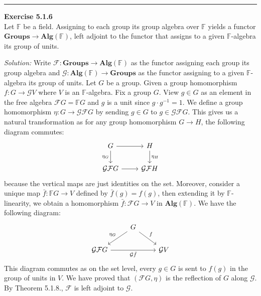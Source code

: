 \documentclass[a4paper, 12pt]{article}
\newenvironment{problem}[2][Exercise]
    { \begin{mdframed}[backgroundcolor=gray!20] \textbf{#1 #2} \\}
    {  \end{mdframed}}
\newenvironment{solution}
    {\textit{Solution:}}
    {}
\begin{document}
\noindent\rule{7in}{2.8pt}
\begin{problem}{5.1.6}
Let \(\mathbb{F}\) be a field. Assigning to each group its group algebra over \(\mathbb{F}\) yields a functor \(\mathbf{Groups}\rightarrow \mathbf{Alg}(\mathbb{F})\), left adjoint to the functor that assigns to a given 
\(\mathbb{F}\)-algebra its group of units.
\end{problem}
\begin{solution}
Write \(\mathcal{F}:\mathbf{Groups}\rightarrow \mathbf{Alg}(\mathbb{F})\) as the functor assigning each group its group algebra and \(\mathcal{G}:\mathbf{Alg}(\mathbb{F})\rightarrow \mathbf{Groups}\) as the functor assigning to a given 
\(\mathbb{F}\)-algebra its group of units. Let \(G\) be a group. Given a group homomorphism \(f:G\rightarrow \mathcal{G}V\) where \(V\) is an \(\mathbb{F}\)-algebra. Fix a group \(G\). View \(g\in G\) as an element in the free algebra \(\mathcal{F}G=\mathbb{F}G\) and \(g\) is a 
unit since \(g\cdot g^{-1}=1\). We define a group homomorphism \(\eta:G\rightarrow \mathcal{G}\mathcal{F}G\) by sending \(g\in G\) to \(g\in \mathcal{G}\mathcal{F}G\). This gives us a natural transformation as for any group homomorphism \(G\rightarrow H\), 
the following diagram commutes:
\[\begin{tikzcd}
	G & H \\
	{\mathcal{G}\mathcal{F}G} & {\mathcal{G}\mathcal{F}H}
	\arrow[from=1-1, to=1-2]
	\arrow["{\eta_G}"', from=1-1, to=2-1]
	\arrow["{\eta_H}", from=1-2, to=2-2]
	\arrow[from=2-1, to=2-2]
\end{tikzcd}\]
because the vertical maps are just identities on the set. Moreover, consider a unique map \(\bar{f}:\mathbb{F}G\rightarrow V\) defined by \(\bar{f}(g)=f(g)\), then extending it by \(\mathbb{F}\)-linearity, we obtain a homomorphism \(\bar{f}:\mathcal{F}G\rightarrow V\) in \(\mathbf{Alg}(\mathbb{F})\). 
We have the following diagram:
\[\begin{tikzcd}
	& G \\
	{\mathcal{G}\mathcal{F}G} && {\mathcal{G}V}
	\arrow["{\eta_G}"', from=1-2, to=2-1]
	\arrow["f", from=1-2, to=2-3]
	\arrow["{\mathcal{G}\bar{f}}"', from=2-1, to=2-3]
\end{tikzcd}\]
This diagram commutes as on the set level, every \(g\in G\) is sent to \(f(g)\) in the group of units in \(V\). We have proved that \((\mathcal{F}G,\eta)\) is the reflection of \(G\) along \(\mathcal{G}\). By Theorem 5.1.8., \(\mathcal{F}\) is left adjoint to \(\mathcal{G}\).
\end{solution}
\end{document}
